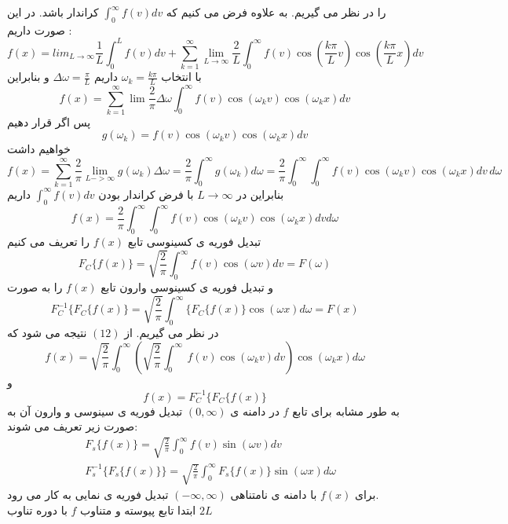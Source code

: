 را در نظر می گیریم. به علاوه فرض می کنیم که
$\int_0^\infty{f(v)dv}$
کراندار باشد. در این صورت داریم :
\[
f(x)=lim_{L\to\infty}{\frac{1}{L}\int_0^L{f(v)dv}}+\sum_{k=1}^{\infty} {\lim _{L\to{\infty}} \frac{2}{L} \int_{0}^{\infty} {f(v) \cos \left(\frac{k \pi}{L} v\right) \cos \left(\frac{k \pi}{L} x\right) d v}}
\]
با انتخاب
$\omega_k=\frac{k\pi}{L}$
داریم
$\Delta\omega=\frac{\pi}{L}$
و بنابراین
\[
f(x)=\sum_{k=1}^{\infty} \lim \frac{2} {\pi} \Delta \omega \int_{0}^{\infty} f(v) \cos \left( \omega_{k} v\right)\cos \left( \omega_{k} x\right)  d v
\]
پس اگر قرار دهیم
\[
g\left(\omega_k\right)=f(v) \cos \left( \omega_{k} v\right)\cos \left( \omega_{k} x\right)  d v
\]
خواهیم داشت
\[
 f(x)=\sum_{k=1}^{\infty}\frac{2} {\pi} \lim_{L->{\infty}} g( \omega_{k} )  \Delta \omega =\frac{2} {\pi} \int_{0}^{{\infty}} g( \omega_{k} )  d \omega=\frac{2} {\pi} \int_{0}^{{\infty}}\int_{0}^{{\infty}} f(v) \cos ( \omega_{k} v)\cos ( \omega_{k} x)  d v\, d\omega
\]
بنابراین در 
$L\to\infty$
با فرض کراندار بودن
$\int_0^\infty{f(v)dv}$
داریم
\begin{equation}
	f(x)=\frac{2} {\pi} \int_{0}^{{\infty}}\int_{0}^{{\infty}} f(v) \cos ( \omega_{k} v)\cos ( \omega_{k} x)  d v d\omega
\end{equation}
تبدیل فوریه ی کسینوسی تابع
$f(x)$
را تعریف می کنیم
\[
F_{C}\{f(x)\}=\sqrt{\frac{2}{\pi}} \int_{0}^{\infty} f(v) \cos (\omega v) d v=F(\omega)
\]
و تبدیل فوریه ی کسینوسی وارون تابع 
$f(x)$
را به صورت
\[
F^{-1}_{C}\{F_{C}\{f(x)\}=\sqrt{\frac{2}{\pi}} \int_{0}^{\infty}\{F_{C}\{f(x)\} \cos (\omega x) d \omega=F(x)
\]
در نظر می گیریم. از
$(12)$
نتیجه می شود که
\[
f(x)=\sqrt{\frac{2}{\pi}} \int_{0}^{\infty}(\sqrt{\frac{2}{\pi}} \int_{0}^{\infty}\ f(v) \cos ( \omega_{k} v)  d v)\cos ( \omega_{k} x) d\omega
\]
و
\[
f(x)=F^{-1}_{C}\{F_{C}\{f(x)\}
\]
به طور مشابه برای تابع 
$f$
در دامنه ی
$(0,\infty)$
تبدیل فوریه ی سینوسی و وارون آن به صورت زیر تعریف می شوند:
\begin{equation*}
	\begin{aligned}
		{} &\
		F_{s}\{f(x)\}=\sqrt{\frac{2}{\pi}} \int_{0}^{\infty} f(v) \sin ( \omega v)  d v
		\\ &\
		F^{-1}_{s}\{F_{s}\{f(x)\}\}=\sqrt{\frac{2}{\pi}} \int_{0}^{\infty} F_{s}\{f(x)\} \sin ( \omega x)  d\omega
	\end{aligned}
\end{equation*}
برای 
$f(x)$
با دامنه ی نامتناهی
$(-\infty,\infty)$
تبدیل فوریه ی نمایی به کار می رود.\\
ابتدا تابع پیوسته و متناوب 
$f$
با دوره تناوب 
$2L$
